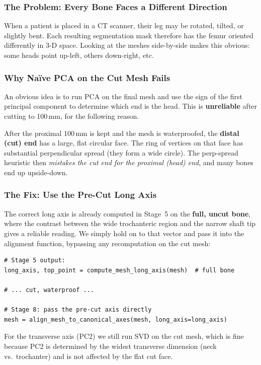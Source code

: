 \documentclass[12pt,a4paper]{article}
\begin{document}
\subsubsection{The Problem: Every Bone Faces a Different Direction}

When a patient is placed in a CT scanner, their leg may be rotated, tilted, or
slightly bent.  Each resulting segmentation mask therefore has the femur oriented
differently in 3-D space.  Looking at the meshes side-by-side makes this obvious:
some heads point up-left, others down-right, etc.

\subsubsection{Why Na\"ive PCA on the Cut Mesh Fails}
\label{sec:naivepca_fail}

An obvious idea is to run PCA on the final mesh and use the sign of the first
principal component to determine which end is the head.  This is \textbf{unreliable}
after cutting to 100\,mm, for the following reason.

After the proximal 100\,mm is kept and the mesh is waterproofed, the
\textbf{distal (cut) end} has a large, flat circular face.
The ring of vertices on that face has substantial perpendicular spread
(they form a wide circle).  The perp-spread heuristic then \emph{mistakes the
cut end for the proximal (head) end}, and many bones end up upside-down.

\subsubsection{The Fix: Use the Pre-Cut Long Axis}

The correct long axis is already computed in Stage~5 on the \textbf{full,
uncut bone}, where the contrast between the wide trochanteric region and the
narrow shaft tip gives a reliable reading.  We simply hold on to that
vector and pass it into the alignment function, bypassing any recomputation
on the cut mesh:

\begin{lstlisting}
# Stage 5 output:
long_axis, top_point = compute_mesh_long_axis(mesh)  # full bone

# ... cut, waterproof ...

# Stage 8: pass the pre-cut axis directly
mesh = align_mesh_to_canonical_axes(mesh, long_axis=long_axis)
\end{lstlisting}

For the transverse axis (PC2) we still run SVD on the cut mesh, which is
fine because PC2 is determined by the widest transverse dimension (neck
vs.~trochanter) and is not affected by the flat cut face.
\end{document}
